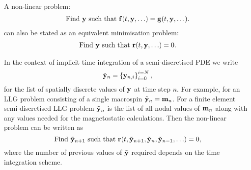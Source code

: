 A non-linear problem:
\begin{equation}
  \begin{aligned}
    \text{Find $\mathbf{y}$ such that } {\mathbf{f}}(t, \mathbf{y}, \ldots) = {\mathbf{g}}(t, \mathbf{y}, \ldots).
  \end{aligned} 
\end{equation}
can also be stated as an equivalent minimisation problem:
\begin{equation}
  \label{eq:non-lin-system}
  \begin{aligned}
    \text{Find $\mathbf{y}$ such that } \mathbf{r}(t, \mathbf{y}, \ldots) = 0.
  \end{aligned}
\end{equation}

In the context of implicit time integration of a semi-discretised PDE we write
\begin{equation}
  \tilde{\mathbf{y}}_n = \left\{ {\mathbf{y}_{n,i}} \right\}_{i=0}^{i=N},
\end{equation}
for the list of spatially discrete values of $\mathbf{y}$ at time step $n$.
For example, for an LLG problem consisting of a single macrospin $\tilde{\mathbf{y}}_n = \mathbf{m}_n$.
For a finite element semi-discretised LLG problem $\tilde{\mathbf{y}}_n$ is the list of all nodal values of $\mathbf{m}_n$ along with any values needed for the magnetostatic calculations.
Then the non-linear problem can be written as 
\begin{equation}
  \text{Find $\tilde{\mathbf{y}}_{n+1}$ such that } \mathbf{r}(t, \tilde{\mathbf{y}}_{n+1}, \tilde{\mathbf{y}}_n, \tilde{\mathbf{y}}_{n-1}, \ldots) = 0,
\end{equation}
where the number of previous values of $\tilde{\mathbf{y}}$ required depends on the time integration scheme.

